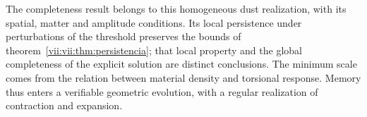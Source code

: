 The completeness result belongs to this homogeneous dust
realization, with its spatial, matter and amplitude conditions. Its
local persistence under perturbations of the threshold preserves the bounds
of theorem~\ref{vii:vii:thm:persistencia}; that local property and the
global completeness of the explicit solution are distinct conclusions.
The minimum scale comes from the relation between material density and
torsional response. Memory thus enters a verifiable geometric
evolution, with a regular realization of contraction
and expansion.
